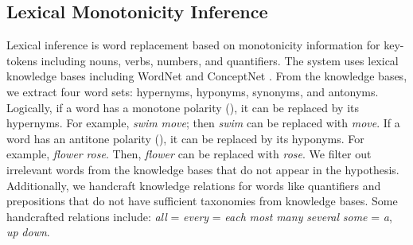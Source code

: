 \documentclass[11pt,a4paper]{article}
\begin{document}
\subsection{Lexical Monotonicity Inference} Lexical inference is word replacement based on monotonicity information for key-tokens including nouns, verbs, numbers, and quantifiers. The system uses lexical knowledge bases including WordNet \cite{wordnet} and ConceptNet \cite{conceptnet}. From the knowledge bases, we extract four word sets: hypernyms, hyponyms, synonyms, and antonyms. Logically, if a word has a monotone polarity (), it can be replaced by its hypernyms. For example, \textit{swim}  \textit{move}; then \textit{swim} can be replaced with \textit{move}. If a word has an antitone polarity (), it can be replaced by its hyponyms. For example, \textit{flower}  \textit{rose}. Then, \textit{flower} can be replaced with \textit{rose}. We filter out irrelevant words from the knowledge bases that do not appear in the hypothesis. Additionally, we handcraft knowledge relations for words like quantifiers and prepositions that do not have sufficient taxonomies from knowledge bases. Some handcrafted relations include: \textit{all} = \textit{every} = \textit{each}  \textit{most}  \textit{many}   \textit{several}  \textit{some} = \textit{a}, \textit{up}  \textit{down}.

\begin{table*}[t!]
\centering
{}
\caption{\label{font-table} Examples of phrasal alignments detected by the syntactic variation module}
\end{table*}
\end{document}
